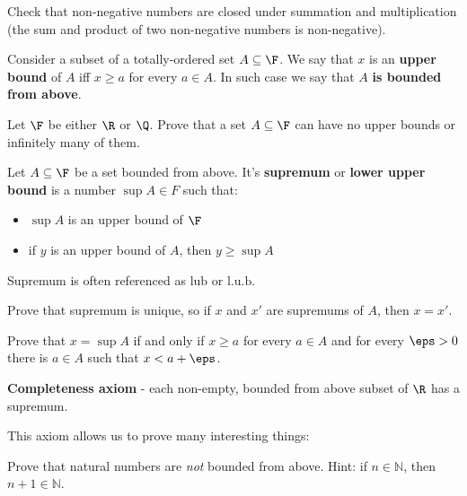 \begin{exercise}
  Check that non-negative numbers are closed under summation and multiplication (the sum and product of two non-negative numbers is non-negative).
\end{exercise}

\begin{definition}
  Consider a subset of a totally-ordered set $A\subseteq \F$. We say that $x$ is an
  \textbf{upper bound} of $A$ iff $x\ge a$ for every $a\in A$.
  In such case we say that $A$ \textbf{is bounded from above}.
\end{definition}

\begin{exercise}
  Let $\F$ be either $\R$ or $\Q$. Prove that a set $A\subseteq \mathbb \F$ can have no upper bounds
  or infinitely many of them.
\end{exercise}

\begin{definition}
  Let $A\subseteq \F$ be a set bounded from above. It's \textbf{supremum} or \textbf{lower upper bound} is a number $\sup A\in F$ such that:
  \begin{itemize}
    \item $\sup A$ is an upper bound of $\F$
    \item if $y$ is an upper bound of $A$, then $y\ge \sup A$
  \end{itemize}
  Supremum is often referenced as $\text{lub}$ or $\text{l.u.b}$.
\end{definition}

\begin{exercise}
  Prove that supremum is unique, so if $x$ and $x'$ are supremums
  of $A$, then $x=x'$.
\end{exercise}

\begin{exercise}
  Prove that $x=\sup A$ if and only if
  $x\ge a$ for every $a\in A$ and for every $\eps > 0$ there is
  $a\in A$ such that $x < a + \eps$.
\end{exercise}

\begin{definition}
  \textbf{Completeness axiom} - each non-empty, bounded from above subset of $\R$ has a supremum.
\end{definition}

This axiom allows us to prove many interesting things:

\begin{exercise}
  Prove that natural numbers are \textit{not} bounded from above.
  Hint: if $n\in \mathbb N$, then $n+1\in \mathbb N$.
\end{exercise}

